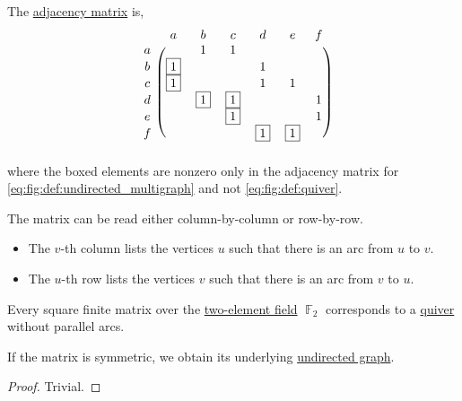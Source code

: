 \begin{example}
  The \hyperref[def:graph_adjacency_matrix]{adjacency matrix} is,
  \begin{equation}\label{ex:quiver_matrices/adjacency}
    \begin{blockarray}{cccccccc}
        & a        & b        & c        & d        & e        & f \\
    \begin{block}{c(ccccccc)}
      a &          & 1        & 1        &          &          &   \\
      b & \fbox{1} &          &          & 1        &          &   \\
      c & \fbox{1} &          &          & 1        & 1        &   \\
      d &          & \fbox{1} & \fbox{1} &          &          & 1 \\
      e &          &          & \fbox{1} &          &          & 1 \\
      f &          &          &          & \fbox{1} & \fbox{1} &   \\
    \end{block}
    \end{blockarray}
  \end{equation}
  where the boxed elements are nonzero only in the adjacency matrix for \eqref{eq:fig:def:undirected_multigraph} and not \eqref{eq:fig:def:quiver}.

  The matrix can be read either column-by-column or row-by-row.
  \begin{itemize}
    \item The \( v \)-th column lists the vertices \( u \) such that there is an arc from \( u \) to \( v \).
    \item The \( u \)-th row lists the vertices \( v \) such that there is an arc from \( v \) to \( u \).
  \end{itemize}
\end{example}

\begin{proposition}\label{thm:graph_undirected_iff_adjacency_matrix_is_symmetric}
  Every square finite matrix over the \hyperref[thm:f2_is_boolean_algebra]{two-element field} \( \BbbF_2 \) corresponds to a \hyperref[def:quiver]{quiver} without parallel arcs.

  If the matrix is symmetric, we obtain its underlying \hyperref[def:undirected_multigraph]{undirected graph}.
\end{proposition}
\begin{proof}
  Trivial.
\end{proof}

